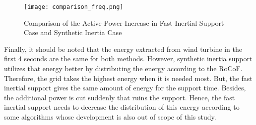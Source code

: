 \begin{figure}[h!]
	\centering
	\texttt{[image: comparison\_freq.png]}
	\caption{Comparison of the Active Power Increase in Fast Inertial Support Case and Synthetic Inertia Case}
	\label{Comp_freq}
\end{figure}
Finally, it should be noted that the energy extracted from wind turbine in the first 4 seconds are the same for both methods. However, synthetic inertia support utilizes that energy better by distributing the energy according to the RoCoF. Therefore, the grid takes the highest energy when it is needed most. But, the fast inertial support gives the same amount of energy for the support time. Besides, the additional power is cut suddenly that ruins the support. Hence, the fast inertial support needs to decrease the distribution of this energy according to some algorithms whose development is also out of scope of this study.